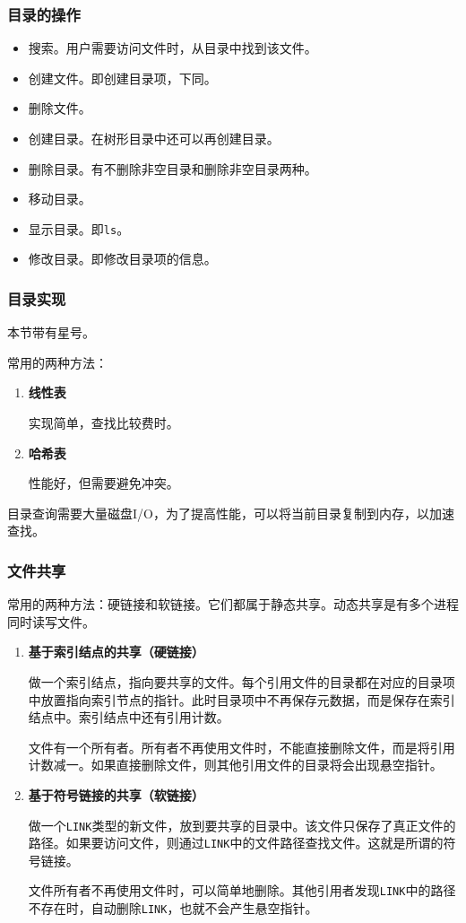 \documentclass[12pt, a4paper, oneside]{ctexart}
\begin{document}
\subsubsection{目录的操作}

\begin{itemize}
  \item 搜索。用户需要访问文件时，从目录中找到该文件。
  \item 创建文件。即创建目录项，下同。
  \item 删除文件。
  \item 创建目录。在树形目录中还可以再创建目录。
  \item 删除目录。有不删除非空目录和删除非空目录两种。
  \item 移动目录。
  \item 显示目录。即\verb|ls|。
  \item 修改目录。即修改目录项的信息。
\end{itemize}

\subsubsection{目录实现}

本节带有星号。

常用的两种方法：
\begin{enumerate}
  \item {\bf 线性表}
  
  实现简单，查找比较费时。

  \item {\bf 哈希表}
  
  性能好，但需要避免冲突。
\end{enumerate}

目录查询需要大量磁盘I/O，为了提高性能，可以将当前目录复制到内存，以加速查找。

\subsubsection{文件共享}

常用的两种方法：硬链接和软链接。它们都属于静态共享。动态共享是有多个进程同时读写文件。
\begin{enumerate}
  \item {\bf 基于索引结点的共享（硬链接）}
  
  做一个索引结点，指向要共享的文件。每个引用文件的目录都在对应的目录项中放置指向索引节点的指针。此时目录项中不再保存元数据，而是保存在索引结点中。索引结点中还有引用计数。

  文件有一个所有者。所有者不再使用文件时，不能直接删除文件，而是将引用计数减一。如果直接删除文件，则其他引用文件的目录将会出现悬空指针。

  \item {\bf 基于符号链接的共享（软链接）}
  
  做一个\verb|LINK|类型的新文件，放到要共享的目录中。该文件只保存了真正文件的路径。如果要访问文件，则通过\verb|LINK|中的文件路径查找文件。这就是所谓的符号链接。

  文件所有者不再使用文件时，可以简单地删除。其他引用者发现\verb|LINK|中的路径不存在时，自动删除\verb|LINK|，也就不会产生悬空指针。
\end{enumerate}
\end{document}
